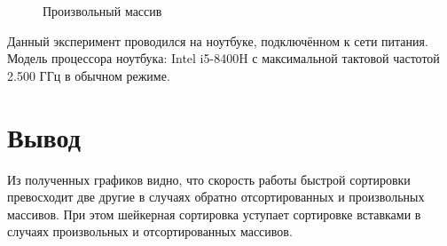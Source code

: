 \begin{figure}[H]
    \centering
    \caption{Произвольный массив}
    \label{img:pltrandom}
\end{figure}

Данный эксперимент проводился на ноутбуке, подключённом к сети питания. Модель процессора ноутбука: Intel i5-8400H с максимальной тактовой частотой 2.500 ГГц в обычном режиме.

\section{Вывод}
Из полученных графиков видно, что скорость работы быстрой сортировки превосходит две другие в случаях обратно отсортированных и произвольных массивов. При этом шейкерная сортировка уступает сортировке вставками в случаях произвольных и отсортированных массивов.

